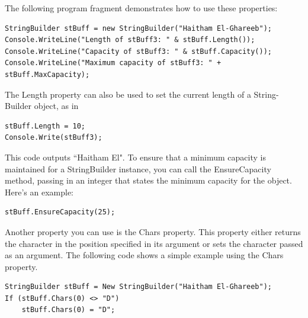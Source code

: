 \documentclass[12pt,a4paper,final,twoside,titlepage]{book}
\begin{document}
The following program fragment demonstrates how to use these properties:
\begin{lstlisting}
StringBuilder stBuff = new StringBuilder("Haitham El-Ghareeb");
Console.WriteLine("Length of stBuff3: " & stBuff.Length());
Console.WriteLine("Capacity of stBuff3: " & stBuff.Capacity());
Console.WriteLine("Maximum capacity of stBuff3: " + stBuff.MaxCapacity);
\end{lstlisting}
The Length property can also be used to set the current length of a String- Builder object, as in
\begin{lstlisting}
stBuff.Length = 10;
Console.Write(stBuff3);
\end{lstlisting}
This code outputs “Haitham El".
To ensure that a minimum capacity is maintained for a StringBuilder instance, you can call the EnsureCapacity method, passing in an integer that states the minimum capacity for the object. Here’s an example:
\begin{lstlisting}
stBuff.EnsureCapacity(25);
\end{lstlisting}
Another property you can use is the Chars property. This property either returns the character in the position specified in its argument or sets the character passed as an argument. The following code shows a simple example using the Chars property.
\begin{lstlisting}
StringBuilder stBuff = New StringBuilder("Haitham El-Ghareeb");
If (stBuff.Chars(0) <> "D")
	stBuff.Chars(0) = "D";
\end{lstlisting}
\end{document}
